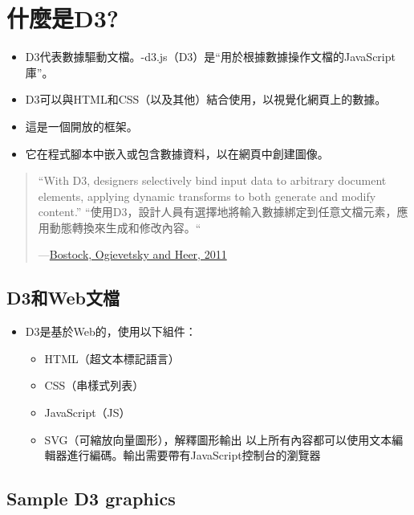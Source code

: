 \documentclass[]{book}
\providecommand{\tightlist}{%
  \setlength{\itemsep}{0pt}\setlength{\parskip}{0pt}}
\begin{document}
\hypertarget{d3}{%
\section{什麼是D3?}\label{d3}}

\begin{itemize}
\tightlist
\item
  D3代表數據驅動文檔。-d3.js（D3）是``用於根據數據操作文檔的JavaScript庫''。
\item
  D3可以與HTML和CSS（以及其他）結合使用，以視覺化網頁上的數據。
\item
  這是一個開放的框架。
\item
  它在程式腳本中嵌入或包含數據資料，以在網頁中創建圖像。
\end{itemize}

\begin{quote}
``With D3, designers selectively bind input data to arbitrary document elements, applying dynamic transforms to both generate and modify content.''
``使用D3，設計人員有選擇地將輸入數據綁定到任意文檔元素，應用動態轉換來生成和修改內容。``

---\href{https://data3.mprog.nl/course/15\%20Readings/60\%20Reading\%206/Bostock_D3.pdf}{Bostock, Ogievetsky and Heer, 2011}
\end{quote}

\hypertarget{d3web}{%
\subsection{D3和Web文檔}\label{d3web}}

\begin{itemize}
\tightlist
\item
  D3是基於Web的，使用以下組件：

  \begin{itemize}
  \tightlist
  \item
    HTML（超文本標記語言）
  \item
    CSS（串樣式列表）
  \item
    JavaScript（JS）
  \item
    SVG（可縮放向量圖形），解釋圖形輸出
    以上所有內容都可以使用文本編輯器進行編碼。輸出需要帶有JavaScript控制台的瀏覽器
  \end{itemize}
\end{itemize}

\hypertarget{sample-d3-graphics}{%
\subsection{Sample D3 graphics}\label{sample-d3-graphics}}
\end{document}
